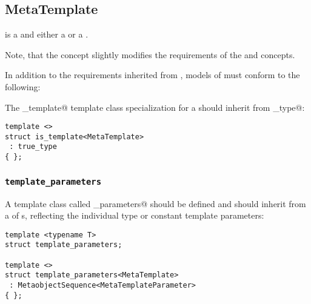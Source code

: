 \subsection{MetaTemplate}
\label{concept-MetaTemplate}



 is a  and either a  or a .

Note, that the  concept slightly modifies the requirements
of the  and  concepts.

In addition to the requirements inherited from ,
models of  must conform to the following:

The \verb@is_template@ template class specialization for a  should
inherit from \verb@true_type@:

\begin{verbatim}
template <>
struct is_template<MetaTemplate>
 : true_type
{ };
\end{verbatim}

\subsubsection{\texttt{template\_parameters}}

A template class called \verb@template_parameters@ should be defined and should
inherit from a  of s,
reflecting the individual type or constant template parameters:

\begin{verbatim}
template <typename T>
struct template_parameters;

template <>
struct template_parameters<MetaTemplate>
 : MetaobjectSequence<MetaTemplateParameter>
{ };
\end{verbatim}

